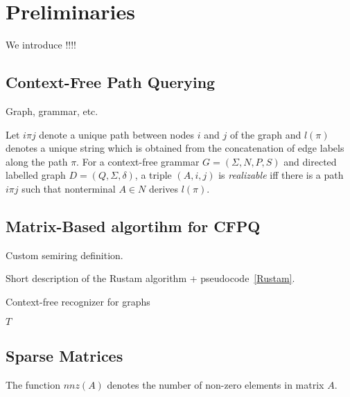 \section{Preliminaries}

We introduce !!!!

\subsection{Context-Free Path Querying}

Graph, grammar, etc.

Let $i\pi j$ denote a unique path between nodes $i$ and $j$ of the graph and $l(\pi)$ denotes a unique string which is obtained from the concatenation of edge labels along the path $\pi$.
For a context-free grammar $G = (\Sigma, N, P, S)$ and directed labelled graph $D = (Q, \Sigma, \delta)$, a triple $(A, i, j)$ is \textit{realizable} iff there is a path $i\pi j$ such that nonterminal $A \in N$ derives $l(\pi)$.

\subsection{Matrix-Based algortihm for CFPQ}

Custom semiring definition.

Short description of the Rustam algorithm + pseudocode~\ref{Rustam}. 
\begin{algorithm}[H]
\begin{algorithmic}[1]
\caption{Context-free recognizer for graphs}
\label{alg:Azimov}
    
    \EndFor    
       
    \EndWhile
\State \Return $T$
\EndFunction
\end{algorithmic}
\end{algorithm}

\subsection{Sparse Matrices}

The function $nnz(A)$ denotes the number of non-zero elements in matrix $A$.
